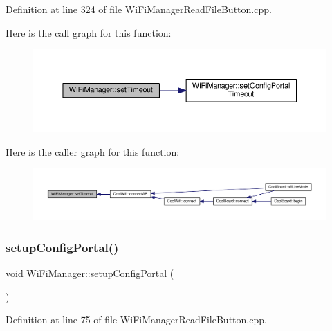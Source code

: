 Definition at line 324 of file Wi\+Fi\+Manager\+Read\+File\+Button.\+cpp.

Here is the call graph for this function\+:\nopagebreak
\begin{figure}[H]
\begin{center}
\leavevmode
\includegraphics[width=350pt]{class_wi_fi_manager_aa6493d59c284ff245edb767ff684756d_cgraph}
\end{center}
\end{figure}
Here is the caller graph for this function\+:\nopagebreak
\begin{figure}[H]
\begin{center}
\leavevmode
\includegraphics[width=350pt]{class_wi_fi_manager_aa6493d59c284ff245edb767ff684756d_icgraph}
\end{center}
\end{figure}
\mbox{\label{class_wi_fi_manager_a1743325d0dd86d011df96b22d2a0ddd6}} 
\subsubsection{\texorpdfstring{setup\+Config\+Portal()}{setupConfigPortal()}}
{\footnotesize\ttfamily void Wi\+Fi\+Manager\+::setup\+Config\+Portal (\begin{DoxyParamCaption}{ }\end{DoxyParamCaption})\hspace{0.3cm}{\ttfamily [private]}}



Definition at line 75 of file Wi\+Fi\+Manager\+Read\+File\+Button.\+cpp.

